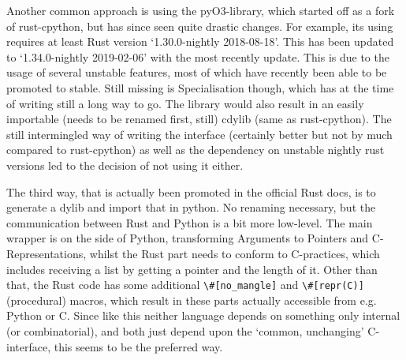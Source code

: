 Another common approach is using the pyO3-library, which started off as a fork of rust-cpython, but has since seen quite drastic changes. For example, its using requires at least Rust version ‘1.30.0-nightly 2018-08-18’.
This has been updated to ‘1.34.0-nightly 2019-02-06’ with the most recently update. This is due to the usage of several unstable features, most of which have recently been able to be promoted to stable. Still missing is Specialisation though, which has at the time of writing still a long way to go. The library would also result in an easily importable (needs to be renamed first, still) cdylib (same as rust-cpython). The still intermingled way of writing the interface (certainly better but not by much compared to rust-cpython) as well as the dependency on unstable nightly rust versions led to the decision of not using it either.

The third way, that is actually been promoted in the official Rust docs, is to
generate a dylib and import that in python. No renaming necessary, but the
communication between Rust and Python is a bit more low-level. The main wrapper
is on the side of Python, transforming Arguments to Pointers and
C-Representations, whilst the Rust part needs to conform to C-practices, which
includes receiving a list by getting a pointer and the length of it. Other than
that, the Rust code has some additional \verb!\#[no_mangle]! and \verb!\#[repr(C)]!
(procedural) macros, which result in these parts actually accessible from e.g.
Python or C. Since like this neither language depends on something only
internal (or combinatorial), and both just depend upon the ‘common, unchanging’
C-interface, this seems to be the preferred way.





